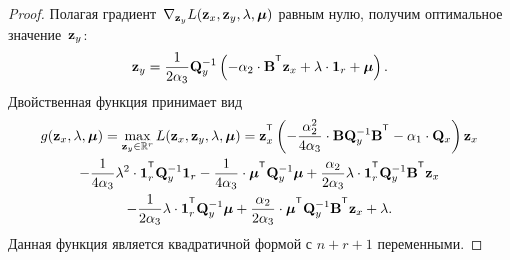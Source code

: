 \begin{proof}
	Полагая градиент~$\nabla_{\mathbf{z}_y} L(\mathbf{z}_x, \mathbf{z}_y, \lambda, \boldsymbol{\mu})$ равным нулю, получим оптимальное значение~$\mathbf{z}_y$:
	\begin{equation*}
		\bz_y = \frac{1}{2\alpha_3} \bQ_y^{-1} \left( - \alpha_2 \cdot \bB^{\T} \bz_x +\lambda \cdot \bOne_r + \bmu \right).
	\end{equation*}
	Двойственная функция принимает вид
	\begin{multline}
		g(\bz_x, \lambda, \bmu)
		= \max_{\bz_y \in \bbR^r} L(\bz_x, \bz_y, \lambda, \bmu) =
		\bz_x^{\T} \left( - \frac{\alpha_2^2}{4\alpha_3} \cdot \bB \bQ_y^{-1} \bB^{\T} - \alpha_1 \cdot \bQ_x\right) \bz_x \\ - \frac{1}{4 \alpha_3} \lambda^2 \cdot \bOne_r^{\T} \bQ_y^{-1} \bOne_r - \frac{1}{4 \alpha_3} \cdot \bmu^{\T} \bQ_y^{-1} \bmu + \frac{\alpha_2}{2 \alpha_3} \lambda \cdot \bOne_r^{\T} \bQ_y^{-1} \bB^{\T} \bz_x \\ - \frac{1}{2 \alpha_3} \lambda \cdot \bOne_r^{\T} \bQ_y^{-1} \bmu + \frac{\alpha_2}{2 \alpha_3} \cdot \bmu^{\T} \bQ_y^{-1} \bB^{\T} \bz_x + \lambda.
		\label{ch3:eq:dual_quadratic_form}
	\end{multline}
	Данная функция является квадратичной формой с $n + r + 1$ переменными.
\end{proof}

